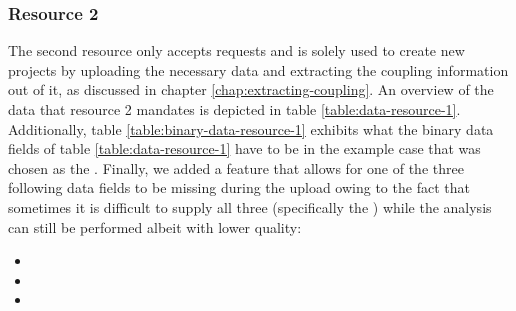 \documentclass[12pt,a4paper]{report}
\begin{document}
\subsubsection{Resource 2}
The second resource only accepts 
requests and is solely used to create new projects by uploading the necessary
data and extracting the coupling information out of it, as discussed in chapter
\ref{chap:extracting-coupling}. An overview of the data that resource 2
mandates is depicted in table \ref{table:data-resource-1}. Additionally, table
\ref{table:binary-data-resource-1} exhibits what the binary data fields of
table \ref{table:data-resource-1} have to be in the example case that  was chosen as the . Finally, we added a feature
that allows for one of the three following data fields to be missing during the
upload owing to the fact that sometimes it is difficult to supply all three
(specifically the ) while the analysis can still be
performed albeit with lower quality:
\begin{itemize}[noitemsep]
  \item {}
  \item {}
  \item {}
\end{itemize}
\end{document}
